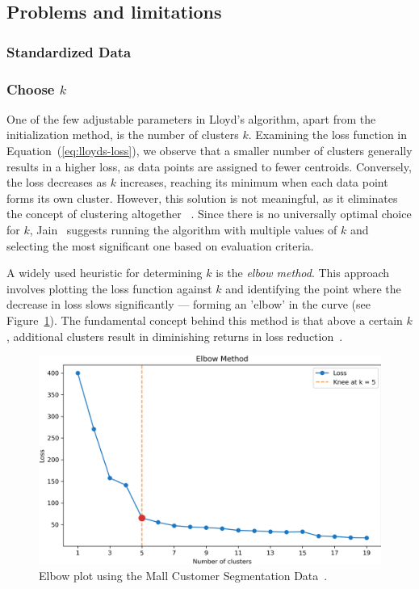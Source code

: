\documentclass[10pt,twocolumn,letterpaper]{article}
\begin{document}

\subsection{Problems and limitations}\label{subsec:problems-and-limitations}

\subsubsection{Standardized Data}


\subsubsection{Choose $k$}

One of the few adjustable parameters in Lloyd's algorithm, apart from the
initialization method, is the number of clusters $k$. Examining the loss
function in Equation~(\ref{eq:lloyds-loss}), we observe that a smaller number
of clusters generally results in a higher loss, as data points are assigned to
fewer centroids. Conversely, the loss decreases as $k$ increases, reaching its
minimum when each data point forms its own cluster. However, this solution is
not meaningful, as it eliminates the concept of clustering altogether
~\cite{deuschle2019}. Since there is no universally optimal choice for $k$,
Jain~\cite{Jain2010651} suggests running the algorithm with multiple values of
$k$ and selecting the most significant one based on evaluation criteria.

A widely used heuristic for determining $k$ is the \textit{elbow method}. This
approach involves plotting the loss function against $k$ and identifying the
point where the decrease in loss slows significantly — forming an 'elbow' in
the curve (see Figure~\ref{fig:elbow-plot}). The fundamental concept behind
this method is that above a certain $k$, additional clusters result in
diminishing returns in loss reduction~\cite{deuschle2019}.

\begin{figure}[t]
    \begin{center}
        \includegraphics[width=0.8\linewidth]{figures/elbow_method}
    \end{center}
    \caption{Elbow plot using the Mall Customer Segmentation Data~\cite{KaggleMallDataset}.}
    \label{fig:elbow-plot}
\end{figure}
\end{document}
